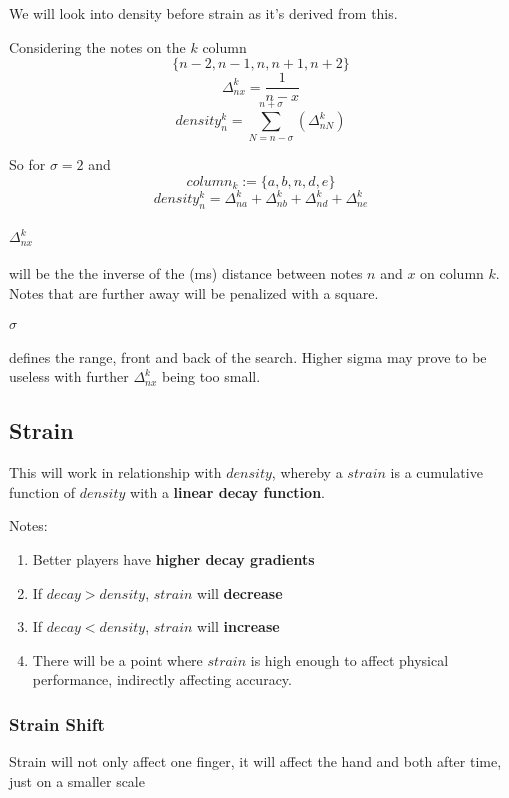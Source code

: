 We will look into density before strain as it's derived from this.

Considering the notes on the $k$ column
$$ \lbrace n-2, n-1, n, n+1, n+2 \rbrace $$
$$ \Delta_{nx}^k = \frac{1}{n - x}$$
$$ density_n^k =
\sum_{N=n-\sigma}^{n+\sigma}
\left(
\Delta_{nN}^k
\right)$$

So for $\sigma = 2$ and 
$$ column_k := \lbrace a, b, n, d, e\rbrace$$
$$ density_n^k = \Delta_{na}^k + \Delta_{nb}^k + \Delta_{nd}^k + \Delta_{ne}^k $$

\paragraph{$\Delta_{nx}^k$} will be the the inverse of the (ms) distance between notes $n$ and $x$ on column $k$. Notes that are further away will be penalized with a square. 

\paragraph{$\sigma$} defines the range, front and back of the search. Higher sigma may prove to be useless with further $\Delta_{nx}^k$ being too small.


\subsection{Strain}

This will work in relationship with $density$, whereby a $strain$ is a cumulative function of $density$ with a \textbf{linear decay function}.

Notes:
\begin{enumerate}
	\item Better players have \textbf{higher decay gradients}
	\item If $decay > density$, $strain$ will \textbf{decrease}
	\item If $decay < density$, $strain$ will \textbf{increase}
	\item There will be a point where $strain$ is high enough to affect physical performance, indirectly affecting accuracy.
\end{enumerate}

\subsubsection{Strain Shift}

Strain will not only affect one finger, it will affect the hand and both after time, just on a smaller scale

